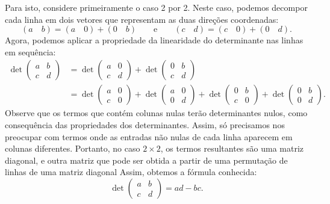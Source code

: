 Para isto, considere primeiramente o caso 2 por 2. Neste caso, podemos decompor cada linha em dois vetores que representam as duas direções coordenadas:
\begin{equation*}
  \left( a \quad b \right) = \left(a \quad 0 \right) + \left( 0 \quad b\right) \qquad \mbox{e} \qquad \left( c \quad d \right) = \left( c \quad 0\right) + \left( 0 \quad d\right).
\end{equation*}
Agora, podemos aplicar a propriedade da linearidade do determinante nas linhas em sequência:
\begin{align*}
  \det{\begin{pmatrix}
      a & b\\
      c & d
    \end{pmatrix}} &= \det{\begin{pmatrix}
      a & 0\\
      c & d
    \end{pmatrix}} + \det{\begin{pmatrix}
      0 & b\\
      c & d
    \end{pmatrix}}\\ 
    &= \det{\begin{pmatrix}
      a & 0\\
      c & 0
    \end{pmatrix}} + \det{\begin{pmatrix}
      a & 0\\
      0 & d
    \end{pmatrix}} + \det{\begin{pmatrix}
      0 & b\\
      c & 0
    \end{pmatrix}} + \det{\begin{pmatrix}
      0 & b\\
      0 & d
    \end{pmatrix}}.
\end{align*}
Observe que os termos que contém colunas nulas terão determinantes nulos, como consequência das propriedades dos determinantes. Assim, só precisamos nos preocupar com termos onde as entradas não nulas de cada linha aparecem em colunas diferentes. Portanto, no caso $2\times 2$, os termos resultantes são uma matriz diagonal, e outra matriz que pode ser obtida a partir de uma permutação de linhas de uma matriz diagonal Assim, obtemos a fórmula conhecida:
\begin{equation*}
	\det{\begin{pmatrix} a & b\\c & d\end{pmatrix}} = ad-bc.
\end{equation*}
